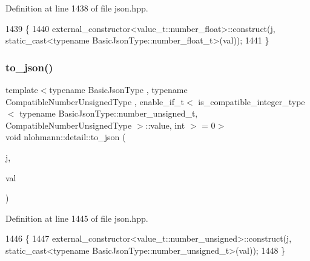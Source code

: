 Definition at line 1438 of file json.\+hpp.


\begin{DoxyCode}
1439 \{
1440     external\_constructor<value\_t::number\_float>::construct(j, static\_cast<typename
       BasicJsonType::number\_float\_t>(val));
1441 \}
\end{DoxyCode}
\mbox{\label{namespacenlohmann_1_1detail_ae5fd66b5517b3b5a6c6b9fd9f29ba8dc}} 
\subsubsection{\texorpdfstring{to\+\_\+json()}{to\_json()}\hspace{0.1cm}{\footnotesize\ttfamily [5/16]}}
{\footnotesize\ttfamily template$<$typename Basic\+Json\+Type , typename Compatible\+Number\+Unsigned\+Type , enable\+\_\+if\+\_\+t$<$ is\+\_\+compatible\+\_\+integer\+\_\+type$<$ typename Basic\+Json\+Type\+::number\+\_\+unsigned\+\_\+t, Compatible\+Number\+Unsigned\+Type $>$\+::value, int $>$  = 0$>$ \\
void nlohmann\+::detail\+::to\+\_\+json (\begin{DoxyParamCaption}\item[{Basic\+Json\+Type \&}]{j,  }\item[{Compatible\+Number\+Unsigned\+Type}]{val }\end{DoxyParamCaption})\hspace{0.3cm}{\ttfamily [noexcept]}}



Definition at line 1445 of file json.\+hpp.


\begin{DoxyCode}
1446 \{
1447     external\_constructor<value\_t::number\_unsigned>::construct(j, static\_cast<typename
       BasicJsonType::number\_unsigned\_t>(val));
1448 \}
\end{DoxyCode}
\mbox{\label{namespacenlohmann_1_1detail_a91fe576be579c8c2fdd14610605c6dd2}} 

